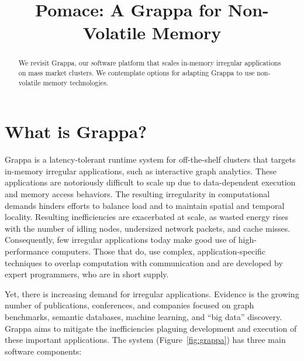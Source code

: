 
\usepackage{microtype}
\usepackage{placeins}

\addtolength{\topmargin}{-.5in}
\addtolength{\textheight}{.7in}
\addtolength{\oddsidemargin}{-.25in}
\addtolength{\evensidemargin}{-.25in}
\addtolength{\textwidth}{.5in}
\addtolength{\topsep}{-3pt}
\linespread{.94}

\title{Pomace: A Grappa for Non-Volatile Memory \vspace{-.2in}}

\maketitle
\begin{abstract}
We revisit Grappa, our software platform that scales in-memory irregular
applications on mass market clusters.
We contemplate options for adapting Grappa to use non-volatile memory technologies.
\end{abstract}
\vspace{-.1in}

\section{What is Grappa?}
Grappa is a latency-tolerant runtime system for off-the-shelf clusters
that targets in-memory irregular applications, such as interactive graph analytics.  These
applications are notoriously difficult to scale up due to
data-dependent execution and memory access behaviors. The resulting
irregularity in computational demands hinders efforts to balance load
and to maintain spatial and temporal locality.  Resulting
inefficiencies are exacerbated at scale, as wasted energy rises with
the number of idling nodes, undersized network packets, and cache
misses.  Consequently, few irregular applications today make good use
of high-performance computers.  Those that do, use complex, application-specific techniques to overlap computation with communication and are
developed by expert programmers, who are in short supply.

Yet, there is increasing demand for irregular applications. Evidence
is the growing number of publications, conferences, and companies
focused on graph benchmarks, semantic databases, machine learning, and
``big data'' discovery. Grappa aims to mitigate the inefficiencies plaguing development and execution of these important applications. The system (Figure~\ref{fig:grappa}) has three main software components:

